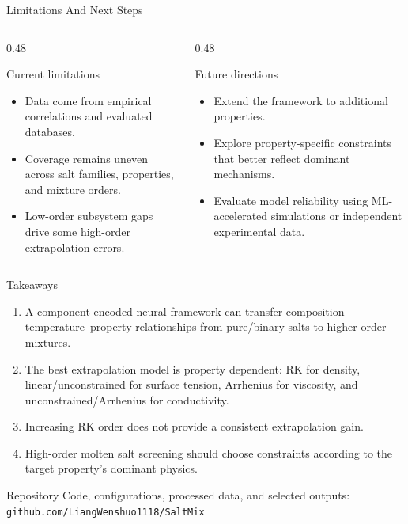 \documentclass[aspectratio=169,10pt]{beamer}
\begin{document}
\begin{frame}{Limitations And Next Steps}
  \begin{columns}[T,onlytextwidth]
    \begin{column}{0.48\textwidth}
      \begin{block}{Current limitations}
        \begin{itemize}
          \item Data come from empirical correlations and evaluated databases.
          \item Coverage remains uneven across salt families, properties, and mixture orders.
          \item Low-order subsystem gaps drive some high-order extrapolation errors.
        \end{itemize}
      \end{block}
    \end{column}
    \begin{column}{0.48\textwidth}
      \begin{block}{Future directions}
        \begin{itemize}
          \item Extend the framework to additional properties.
          \item Explore property-specific constraints that better reflect dominant mechanisms.
          \item Evaluate model reliability using ML-accelerated simulations or independent experimental data.
        \end{itemize}
      \end{block}
    \end{column}
  \end{columns}
\end{frame}

\begin{frame}{Takeaways}
  \begin{enumerate}
    \item A component-encoded neural framework can transfer composition--temperature--property relationships from pure/binary salts to higher-order mixtures.
    \item The best extrapolation model is property dependent: RK for density, linear/unconstrained for surface tension, Arrhenius for viscosity, and unconstrained/Arrhenius for conductivity.
    \item Increasing RK order does not provide a consistent extrapolation gain.
    \item High-order molten salt screening should choose constraints according to the target property's dominant physics.
  \end{enumerate}

  \vfill
  \begin{block}{Repository}
    Code, configurations, processed data, and selected outputs: \texttt{github.com/LiangWenshuo1118/SaltMix}
  \end{block}
\end{frame}
\end{document}
